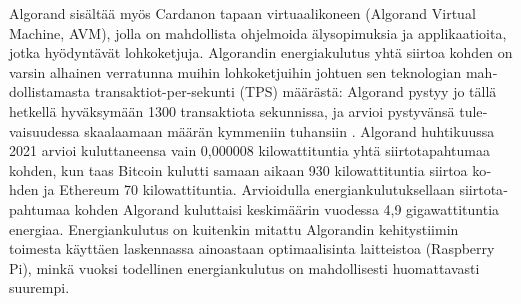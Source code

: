 \begin{otherlanguage}{english}
Algorand sisältää myös Cardanon tapaan virtuaalikoneen (Algorand Virtual Machine, AVM), jolla on mahdollista ohjelmoida älysopimuksia ja applikaatioita, jotka hyödyntävät lohkoketjuja. Algorandin energiakulutus yhtä siirtoa kohden on varsin alhainen verratunna muihin lohkoketjuihin johtuen sen teknologian mahdollistamasta transaktiot-per-sekunti (TPS) määrästä: Algorand pystyy jo tällä hetkellä hyväksymään 1300 transaktiota sekunnissa, ja arvioi pystyvänsä tulevaisuudessa skaalaamaan määrän kymmeniin tuhansiin \cite{algorandenergy}. Algorand huhtikuussa 2021 arvioi kuluttaneensa vain 0,000008 kilowattituntia yhtä siirtotapahtumaa kohden, kun taas Bitcoin kulutti samaan aikaan 930 kilowattituntia siirtoa kohden ja Ethereum 70 kilowattituntia. Arvioidulla energiankulutuksellaan siirtotapahtumaa kohden Algorand kuluttaisi keskimäärin vuodessa 4,9 gigawattituntia energiaa. Energiankulutus on kuitenkin mitattu Algorandin kehitystiimin toimesta käyttäen laskennassa ainoastaan optimaalisinta laitteistoa (Raspberry Pi), minkä vuoksi todellinen energiankulutus on mahdollisesti huomattavasti suurempi.

\end{otherlanguage}